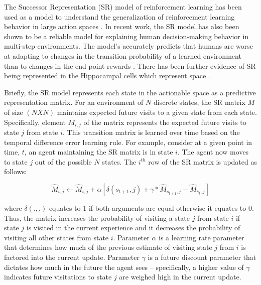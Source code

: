 The Successor Representation (SR) model of reinforcement learning has been used as a model to understand the generalization of reinforcement learning behavior in large action spaces \cite{dayan1993improving}. In recent work, the SR model has also been shown to be a reliable model for explaining human decision-making behavior in multi-step environments. The model's  accurately predicts that humans are worse at adapting to changes in the transition probability of a learned environment than to changes in the end-point rewards \cite{momennejad2017successor}. There has been further evidence of SR being represented in the Hippocampal cells which represent space \cite{gershman2018successor, stachenfeld2017hippocampus}.

Briefly, the SR model represents each state in the actionable space as a predictive representation matrix. For an environment of $N$ discrete states, the SR matrix $M$ of size $(N X N)$ maintains expected future visits to a given state from each state. Specifically, element $M_{i,j}$ of the matrix represents the expected future visits to state $j$ from state $i$. This transition matrix is learned over time based on the temporal difference error learning rule. For example, consider at a given point in time, $t$, an agent maintaining the SR matrix is in state $i$. The agent now moves to state $j$ out of the possible $N$ states. The $i^{th}$ row of the SR matrix is updated as follows:

\begin{equation}
	\hat{M}_{i,j} \leftarrow \hat{M}_{i,j} + \alpha[\delta(s_{t+1},j) + \gamma*\hat{M}_{s_{t+1},j} - \hat{M}_{s_t,j}]
\end{equation}

where $\delta(., .)$ equates to 1 if both arguments are equal otherwise it equates to 0. Thus, the matrix increases the probability of visiting a state $j$ from state $i$ if state $j$ is visited in the current experience and it decreases the probability of visiting all other states from state $i$. Parameter $\alpha$ is a learning rate parameter that determines how much of the previous estimate of visiting state $j$ from $i$ is factored into the current update. Parameter $\gamma$ is a future discount parameter that dictates how much in the future the agent sees -- specifically, a higher value of $\gamma$ indicates future visitations to state $j$ are weighed high in the current update.

